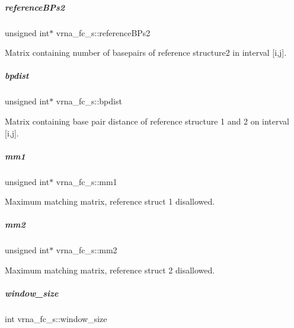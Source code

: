 \mbox{\label{group__fold__compound_a19187f33433e84683730dedff8544f71}} 
\subparagraph{\texorpdfstring{reference\+B\+Ps2}{referenceBPs2}}
{\footnotesize\ttfamily unsigned int$\ast$ vrna\+\_\+fc\+\_\+s\+::reference\+B\+Ps2}



Matrix containing number of basepairs of reference structure2 in interval \mbox{[}i,j\mbox{]}. 

\mbox{\label{group__fold__compound_a5c53e55583ce096148075bc240fc2bce}} 
\subparagraph{\texorpdfstring{bpdist}{bpdist}}
{\footnotesize\ttfamily unsigned int$\ast$ vrna\+\_\+fc\+\_\+s\+::bpdist}



Matrix containing base pair distance of reference structure 1 and 2 on interval \mbox{[}i,j\mbox{]}. 

\mbox{\label{group__fold__compound_a0af5a888bac2ae32107da32776144504}} 
\subparagraph{\texorpdfstring{mm1}{mm1}}
{\footnotesize\ttfamily unsigned int$\ast$ vrna\+\_\+fc\+\_\+s\+::mm1}



Maximum matching matrix, reference struct 1 disallowed. 

\mbox{\label{group__fold__compound_a54c0b979274b285a7e093ed54aa3252e}} 
\subparagraph{\texorpdfstring{mm2}{mm2}}
{\footnotesize\ttfamily unsigned int$\ast$ vrna\+\_\+fc\+\_\+s\+::mm2}



Maximum matching matrix, reference struct 2 disallowed. 

\mbox{\label{group__fold__compound_adacbf7cdfb47d3072683ab509de735f6}} 
\subparagraph{\texorpdfstring{window\+\_\+size}{window\_size}}
{\footnotesize\ttfamily int vrna\+\_\+fc\+\_\+s\+::window\+\_\+size}



